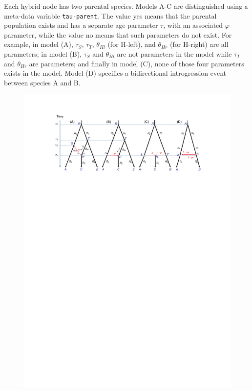 \documentclass{book}
\numberwithin{equation}{section} \renewcommand{\baselinestretch}{0.55}
\begin{document}
Each hybrid node has two parental species.  Models A-C are
distinguished using a meta-data variable \texttt{tau-parent}.  The
value yes means that the parental population exists and has a separate
age parameter $\tau$, with an associated $\varphi$ parameter, while
the value no means that such parameters do not exist.  For example, in
model (A), $\tau_S$, $\tau_T$, $\theta_{Hl}$ (for H-left), and
$\theta_{Hr}$ (for H-right) are all parameters; in model (B), $\tau_S$
and $\theta_{Hl}$ are not parameters in the model while $\tau_T$ and
$\theta_{Hr}$ are parameters; and finally in model (C), none of those
four parameters exists in the model.  Model (D) specifies a
bidirectional introgression event between species A and B.


\begin{figure} [t]
  \centering \includegraphics[scale=0.7890]{figures/fig-msci-models}


\end{figure}
\end{document}
